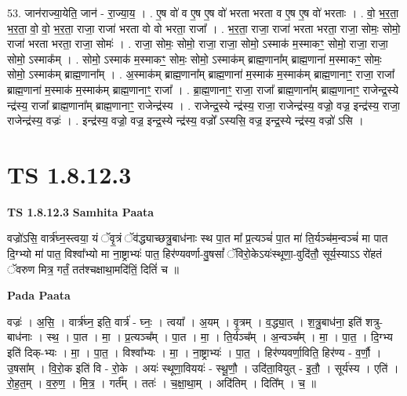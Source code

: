 \documentclass[17pt]{extarticle}
\begin{document}
53. जान॑राज्या॒येति॒ जान॑ - रा॒ज्या॒य॒ । . ए॒ष वो॑ व ए॒ष ए॒ष वो॑ भरता भरता व ए॒ष ए॒ष वो॑ भरताः । . वो॒ भ॒र॒ता॒ भ॒र॒ता॒ वो॒ वो॒ भ॒र॒ता॒ राजा॒ राजा॑ भरता वो वो भरता॒ राजा᳚ । . भ॒र॒ता॒ राजा॒ राजा॑ भरता भरता॒ राजा॒ सोमः॒ सोमो॒ राजा॑ भरता भरता॒ राजा॒ सोमः॑ । . राजा॒ सोमः॒ सोमो॒ राजा॒ राजा॒ सोमो॒ ऽस्माक॑ म॒स्माकꣳ॒॒ सोमो॒ राजा॒ राजा॒ सोमो॒ ऽस्माक᳚म् । . सोमो॒ ऽस्माक॑ म॒स्माकꣳ॒॒ सोमः॒ सोमो॒ ऽस्माक॑म् ब्राह्म॒णाना᳚म् ब्राह्म॒णाना॑ म॒स्माकꣳ॒॒ सोमः॒ सोमो॒ ऽस्माक॑म् ब्राह्म॒णाना᳚म् । . अ॒स्माक॑म् ब्राह्म॒णाना᳚म् ब्राह्म॒णाना॑ म॒स्माक॑ म॒स्माक॑म् ब्राह्म॒णानाꣳ॒॒ राजा॒ राजा᳚ ब्राह्म॒णाना॑ म॒स्माक॑ म॒स्माक॑म् ब्राह्म॒णानाꣳ॒॒ राजा᳚ । . ब्रा॒ह्म॒णानाꣳ॒॒ राजा॒ राजा᳚ ब्राह्म॒णाना᳚म् ब्राह्म॒णानाꣳ॒॒ राजेन्द्र॒स्ये न्द्र॑स्य॒ राजा᳚ ब्राह्म॒णाना᳚म् ब्राह्म॒णानाꣳ॒॒ राजेन्द्र॑स्य । . राजेन्द्र॒स्ये न्द्र॑स्य॒ राजा॒ राजेन्द्र॑स्य॒ वज्रो॒ वज्र॒ इन्द्र॑स्य॒ राजा॒ राजेन्द्र॑स्य॒ वज्रः॑ । . इन्द्र॑स्य॒ वज्रो॒ वज्र॒ इन्द्र॒स्ये न्द्र॑स्य॒ वज्रो᳚ ऽस्यसि॒ वज्र॒ इन्द्र॒स्ये न्द्र॑स्य॒ वज्रो॑ ऽसि । \newline
\pagebreak
{}

\section{ TS 1.8.12.3 }

\textbf{TS 1.8.12.3 } \newline
\textbf{Samhita Paata} \newline

वज्रो॑ऽसि॒ वार्त्र॑घ्न॒स्त्वया॒ यं ॅवृ॒त्रं ॅव॑द्ध्याच्छत्रु॒बाध॑नाः स्थ पा॒त मा᳚ प्र॒त्यञ्चं॑ पा॒त मा॑ ति॒र्यञ्च॑म॒न्वञ्चं॑ मा पात दि॒ग्भ्यो मा॑ पात॒ विश्वा᳚भ्यो मा ना॒ष्ट्राभ्यः॑ पात॒ हिर॑ण्यवर्णा-वु॒षसां᳚ ॅविरो॒केऽयः॑स्थूणा॒-वुदि॑तौ॒ सूर्य॒स्याऽऽ रो॑हतं ॅवरुण मित्र॒ गर्तं॒ तत॑श्चक्षाथा॒मदि॑तिं॒ दितिं॑ च ॥ \newline

\textbf{Pada Paata} \newline

वज्रः॑ । अ॒सि॒ । वार्त्र॑घ्न॒ इति॒ वार्त्र॑ - घ्नः॒ । त्वया᳚ । अ॒यम् । वृ॒त्रम् । व॒द्ध्या॒त् । श॒त्रु॒बाध॑ना॒ इति॑ शत्रु-बाध॑नाः । स्थ॒ । पा॒त । मा॒ । प्र॒त्यञ्च᳚म् । पा॒त । मा॒ । ति॒र्यञ्च᳚म् । अ॒न्वञ्च᳚म् । मा॒ । पा॒त॒ । दि॒ग्भ्य इति॑ दिक्-भ्यः । मा॒ । पा॒त॒ । विश्वा᳚भ्यः । मा॒ । ना॒ष्ट्राभ्यः॑ । पा॒त॒ । हिर॑ण्यवर्णा॒विति॒ हिर॑ण्य - व॒र्णौ॒ । उ॒षसा᳚म् । वि॒रो॒क इति॑ वि - रो॒के । अयः॑ स्थूणा॒विययः॑ - स्थू॒णौ॒ । उदि॑ता॒वियुत् - इ॒तौ॒ । सूर्य॑स्य । एति॑ । रो॒ह॒त॒म् । व॒रु॒ण॒ । मि॒त्र॒ । गर्त᳚म् । ततः॑ । च॒क्षा॒था॒म् । अदि॑तिम् । दिति᳚म् । च॒ ॥  \newline
\end{document}
